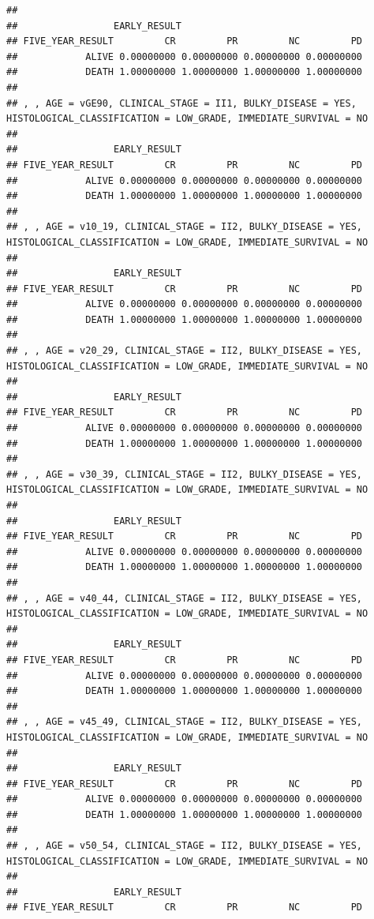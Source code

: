 \documentclass[]{article}
\begin{document}
\begin{verbatim}
## 
##                 EARLY_RESULT
## FIVE_YEAR_RESULT         CR         PR         NC         PD
##            ALIVE 0.00000000 0.00000000 0.00000000 0.00000000
##            DEATH 1.00000000 1.00000000 1.00000000 1.00000000
## 
## , , AGE = vGE90, CLINICAL_STAGE = II1, BULKY_DISEASE = YES, HISTOLOGICAL_CLASSIFICATION = LOW_GRADE, IMMEDIATE_SURVIVAL = NO
## 
##                 EARLY_RESULT
## FIVE_YEAR_RESULT         CR         PR         NC         PD
##            ALIVE 0.00000000 0.00000000 0.00000000 0.00000000
##            DEATH 1.00000000 1.00000000 1.00000000 1.00000000
## 
## , , AGE = v10_19, CLINICAL_STAGE = II2, BULKY_DISEASE = YES, HISTOLOGICAL_CLASSIFICATION = LOW_GRADE, IMMEDIATE_SURVIVAL = NO
## 
##                 EARLY_RESULT
## FIVE_YEAR_RESULT         CR         PR         NC         PD
##            ALIVE 0.00000000 0.00000000 0.00000000 0.00000000
##            DEATH 1.00000000 1.00000000 1.00000000 1.00000000
## 
## , , AGE = v20_29, CLINICAL_STAGE = II2, BULKY_DISEASE = YES, HISTOLOGICAL_CLASSIFICATION = LOW_GRADE, IMMEDIATE_SURVIVAL = NO
## 
##                 EARLY_RESULT
## FIVE_YEAR_RESULT         CR         PR         NC         PD
##            ALIVE 0.00000000 0.00000000 0.00000000 0.00000000
##            DEATH 1.00000000 1.00000000 1.00000000 1.00000000
## 
## , , AGE = v30_39, CLINICAL_STAGE = II2, BULKY_DISEASE = YES, HISTOLOGICAL_CLASSIFICATION = LOW_GRADE, IMMEDIATE_SURVIVAL = NO
## 
##                 EARLY_RESULT
## FIVE_YEAR_RESULT         CR         PR         NC         PD
##            ALIVE 0.00000000 0.00000000 0.00000000 0.00000000
##            DEATH 1.00000000 1.00000000 1.00000000 1.00000000
## 
## , , AGE = v40_44, CLINICAL_STAGE = II2, BULKY_DISEASE = YES, HISTOLOGICAL_CLASSIFICATION = LOW_GRADE, IMMEDIATE_SURVIVAL = NO
## 
##                 EARLY_RESULT
## FIVE_YEAR_RESULT         CR         PR         NC         PD
##            ALIVE 0.00000000 0.00000000 0.00000000 0.00000000
##            DEATH 1.00000000 1.00000000 1.00000000 1.00000000
## 
## , , AGE = v45_49, CLINICAL_STAGE = II2, BULKY_DISEASE = YES, HISTOLOGICAL_CLASSIFICATION = LOW_GRADE, IMMEDIATE_SURVIVAL = NO
## 
##                 EARLY_RESULT
## FIVE_YEAR_RESULT         CR         PR         NC         PD
##            ALIVE 0.00000000 0.00000000 0.00000000 0.00000000
##            DEATH 1.00000000 1.00000000 1.00000000 1.00000000
## 
## , , AGE = v50_54, CLINICAL_STAGE = II2, BULKY_DISEASE = YES, HISTOLOGICAL_CLASSIFICATION = LOW_GRADE, IMMEDIATE_SURVIVAL = NO
## 
##                 EARLY_RESULT
## FIVE_YEAR_RESULT         CR         PR         NC         PD

\end{verbatim}
\end{document}
